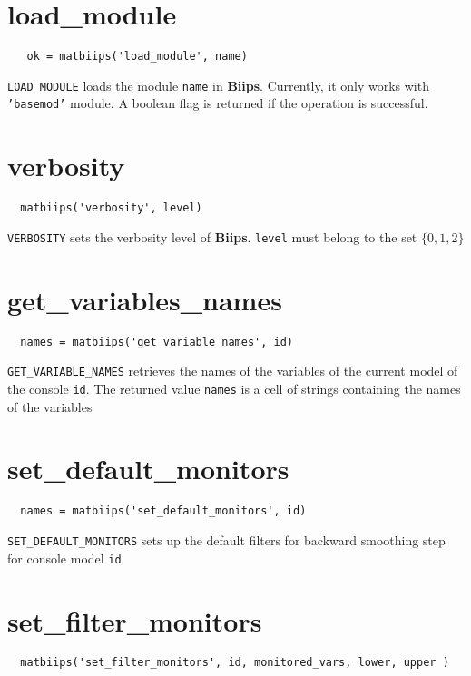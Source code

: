 \documentclass[11pt,twoside]{article}
\newcommand{\biips}{{\bf Biips}{}}
\begin{document}
\section{load\_module}

 \begin{lstlisting}
   ok = matbiips('load_module', name)
 \end{lstlisting}

  \texttt{LOAD\_MODULE} loads the module \texttt{name} in \biips. Currently, it only works with \texttt{'basemod'} module. A
  boolean flag is returned if the operation is successful.

\section{verbosity}

 \begin{lstlisting}
  matbiips('verbosity', level)
 \end{lstlisting}

  \texttt{VERBOSITY} sets the verbosity level of \biips . \texttt{level} must belong to the set $\{0,1,2\}$

\section{get\_variables\_names}

 \begin{lstlisting}
  names = matbiips('get_variable_names', id)
 \end{lstlisting}

 \texttt{GET\_VARIABLE\_NAMES} retrieves the names of the variables of the current model of the console \texttt{id}. The returned value \texttt{names}
 is a cell of strings containing the names of the variables

\section{set\_default\_monitors}

 \begin{lstlisting}
  names = matbiips('set_default_monitors', id)
 \end{lstlisting}

 \texttt{SET\_DEFAULT\_MONITORS} sets up the default filters for backward smoothing step for console model \texttt{id}

\section{set\_filter\_monitors}
 \begin{lstlisting}
  matbiips('set_filter_monitors', id, monitored_vars, lower, upper )
 \end{lstlisting}
\end{document}
